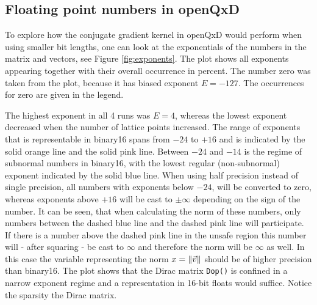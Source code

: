 \documentclass{article}
\theoremstyle{plain} %
\theoremstyle{convention} %
\theoremstyle{remark} %
\def\code#1{\texttt{#1}}
\numberwithin{equation}{section}
\begin{document}
\begin{figure}
    \label{fig:number_line}
\end{figure}

\subsection{Floating point numbers in openQxD}

To explore how the conjugate gradient kernel in openQxD would perform when using smaller bit lengths, one can look at the exponentials of the numbers in the matrix and vectors, see Figure \ref{fig:exponents}. The plot shows all exponents appearing together with their overall occurrence in percent. The number zero was taken from the plot, because it has biased exponent $E=-127$. The occurrences for zero are given in the legend.

The highest exponent in all 4 runs was $E=4$, whereas the lowest exponent decreased when the number of lattice points increased. The range of exponents that is representable in \gls{binary16} spans from \textcolor{corange}{$-24$} to \textcolor{cpink}{$+16$} and is indicated by the \textcolor{corange}{solid orange line} and the \textcolor{cpink}{solid pink line}. Between \textcolor{corange}{$-24$} and \textcolor{cblue}{$-14$} is the regime of subnormal numbers in \gls{binary16}, with the lowest regular (non-subnormal) exponent indicated by the \textcolor{cblue}{solid blue line}. When using half precision instead of single precision, all numbers with exponents below \textcolor{corange}{$-24$}, will be converted to zero, whereas exponents above \textcolor{cpink}{$+16$} will be cast to $\pm \infty$ depending on the sign of the number. It can be seen, that when calculating the norm of these numbers, only numbers between the \textcolor{cblue}{dashed blue line} and the \textcolor{cpink}{dashed pink line} will participate. If there is a number above the dashed pink line in the \textcolor{cyellow}{unsafe region} this number will - after squaring - be cast to $\infty$ and therefore the norm will be $\infty$ as well\footnotemark. In this case the variable representing the norm $x = \norm{\vec{v}}$ should be of higher precision than \gls{binary16}. The plot shows that the Dirac matrix \code{Dop()} is confined in a narrow exponent regime and a representation in 16-bit floats would suffice. Notice the sparsity the Dirac matrix.

\end{document}
